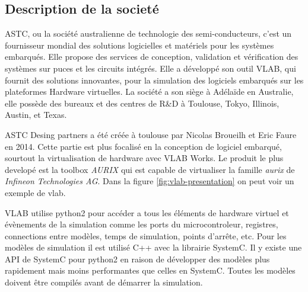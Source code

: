 \subsection{Description de la societ\'e}
ASTC, ou la société australienne de technologie des semi-conducteurs, c’est un fournisseur mondial des solutions logicielles et matériels pour les systèmes embarqués. Elle propose des services de conception, validation et vérification des systèmes sur puces et les circuits intégrés. Elle a développé son outil VLAB, qui fournit des solutions innovantes, pour la simulation des logiciels embarqués sur les plateformes Hardware virtuelles. La société a son siège à Adélaïde en Australie, elle possède des bureaux et des centres de R&D à Toulouse, Tokyo, Illinois, Austin, et Texas. 

ASTC Desing partners a été créée \`a toulouse par Nicolas Broueilh et Eric Faure en 2014. Cette partie est plus focalis\'e en la conception de logiciel embarqu\'e, sourtout la virtualisation de hardware avec VLAB Works. Le produit le plus develop\'e est la toolbox \textit{AURIX} qui est capable de virtualiser la famille \textit{aurix} de \textit{Infineon Technologies AG}. Dans la figure \ref{fig:vlab-presentation} on peut voir un exemple de vlab.

VLAB utilise python2 pour accéder a tous les éléments de hardware virtuel et évènements de la simulation comme les ports du microcontroleur, registres, connections entre mod\`eles, temps de simulation, points d'arrête, etc. Pour les modèles de simulation il est utilis\'e C++ avec la librairie SystemC. Il y existe une API de SystemC pour python2 en raison de développer des mod\`eles plus rapidement mais moins performantes que celles en SystemC. Toutes les mod\`eles doivent \^etre compil\'es avant de d\'emarrer la simulation.



